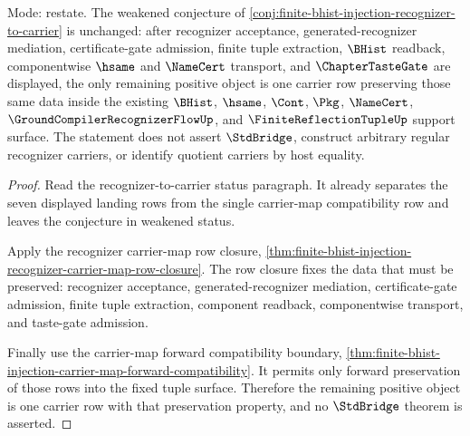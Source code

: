 \begin{theorem}
\label{thm:finite-bhist-injection-carrier-map-obstruction-update}
Mode: restate. The weakened conjecture of \autoref{conj:finite-bhist-injection-recognizer-to-carrier} is unchanged: after recognizer acceptance, generated-recognizer mediation, certificate-gate admission, finite tuple extraction, $\BHist$ readback, componentwise $\hsame$ and $\NameCert$ transport, and $\ChapterTasteGate$ are displayed, the only remaining positive object is one carrier row preserving those same data inside the existing $\BHist$, $\hsame$, $\Cont$, $\Pkg$, $\NameCert$, $\GroundCompilerRecognizerFlowUp$, and $\FiniteReflectionTupleUp$ support surface. The statement does not assert $\StdBridge$, construct arbitrary regular recognizer carriers, or identify quotient carriers by host equality.
\end{theorem}
\begin{proof}
Read the recognizer-to-carrier status paragraph. It already separates the seven displayed landing rows from the single carrier-map compatibility row and leaves the conjecture in weakened status.

Apply the recognizer carrier-map row closure, \autoref{thm:finite-bhist-injection-recognizer-carrier-map-row-closure}. The row closure fixes the data that must be preserved: recognizer acceptance, generated-recognizer mediation, certificate-gate admission, finite tuple extraction, component readback, componentwise transport, and taste-gate admission.

Finally use the carrier-map forward compatibility boundary, \autoref{thm:finite-bhist-injection-carrier-map-forward-compatibility}. It permits only forward preservation of those rows into the fixed tuple surface. Therefore the remaining positive object is one carrier row with that preservation property, and no $\StdBridge$ theorem is asserted.
\end{proof}

